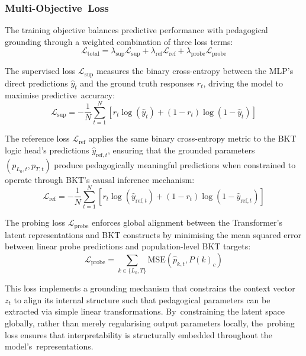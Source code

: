 \documentclass[applsci,article,accept,moreauthors,pdftex]{Definitions/mdpi}
\begin{document}
\subsubsection{Multi-Objective~Loss} \label{sec_loss}

The training objective balances predictive performance with pedagogical grounding through a weighted combination of three loss terms:
\begin{equation} \label{eq:total_loss}
    \mathcal{L}_{\text{total}} = \lambda_{\text{sup}} \mathcal{L}_{\text{sup}} + \lambda_{\text{ref}} \mathcal{L}_{\text{ref}} + \lambda_{\text{probe}} \mathcal{L}_{\text{probe}}
\end{equation}

The supervised loss $\mathcal{L}_{\text{sup}}$ measures the binary cross-entropy between the MLP's direct predictions $\hat{y}_t$ and the ground truth responses $r_t$, driving the model to {maximise} predictive~accuracy:
\begin{equation}
    \mathcal{L}_{\text{sup}} = -\frac{1}{N} \sum_{t=1}^N \left[ r_t \log(\hat{y}_t) + (1-r_t) \log(1-\hat{y}_t) \right]
\end{equation}

The reference loss $\mathcal{L}_{\text{ref}}$ applies the same binary cross-entropy metric to the BKT logic head's predictions $\hat{y}_{\text{ref},t}$, ensuring that the grounded parameters $(p_{L_0,t}, p_{T,t})$ produce pedagogically meaningful predictions when constrained to operate through BKT's causal inference mechanism:
\begin{equation}
    \mathcal{L}_{\text{ref}} = -\frac{1}{N} \sum_{t=1}^N \left[ r_t \log(\hat{y}_{\text{ref},t}) + (1-r_t) \log(1-\hat{y}_{\text{ref},t}) \right]
\end{equation}

The probing loss $\mathcal{L}_{\text{probe}}$ enforces global alignment between the Transformer's latent representations and BKT constructs by {minimising} the mean squared error between linear probe predictions and population-level BKT targets:
\begin{equation}
    \mathcal{L}_{\text{probe}} = \sum_{k \in \{L_0, T\}} \text{MSE}\left( \hat{p}_{k,t}, P(k)_c \right)
\end{equation}

This loss implements a grounding mechanism that constrains the context vector $z_t$ to align its internal structure such that pedagogical parameters can be extracted via simple linear transformations. By~constraining the latent space globally, rather than merely {regularising} output parameters locally, the~probing loss ensures that interpretability is structurally embedded throughout the model's~representations.
\end{document}
